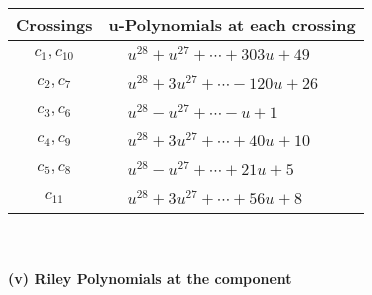 \documentclass[1p]{elsarticle_modified}
\theoremstyle{definition}
\begin{document}
\begin{tabular}{m{50pt}|m{274pt}}
Crossings & \hspace{64pt}u-Polynomials at each crossing \\
\hline $$\begin{aligned}c_{1},c_{10}\end{aligned}$$&$\begin{aligned}
&u^{28}+u^{27}+\cdots+303 u+49
\end{aligned}$\\
\hline $$\begin{aligned}c_{2},c_{7}\end{aligned}$$&$\begin{aligned}
&u^{28}+3 u^{27}+\cdots-120 u+26
\end{aligned}$\\
\hline $$\begin{aligned}c_{3},c_{6}\end{aligned}$$&$\begin{aligned}
&u^{28}- u^{27}+\cdots- u+1
\end{aligned}$\\
\hline $$\begin{aligned}c_{4},c_{9}\end{aligned}$$&$\begin{aligned}
&u^{28}+3 u^{27}+\cdots+40 u+10
\end{aligned}$\\
\hline $$\begin{aligned}c_{5},c_{8}\end{aligned}$$&$\begin{aligned}
&u^{28}- u^{27}+\cdots+21 u+5
\end{aligned}$\\
\hline $$\begin{aligned}c_{11}\end{aligned}$$&$\begin{aligned}
&u^{28}+3 u^{27}+\cdots+56 u+8
\end{aligned}$\\
\hline
\end{tabular}\\~\\
\newpage\renewcommand{\arraystretch}{1}
\flushleft \textbf{(v) Riley Polynomials at the component}\newline \\
\end{document}
